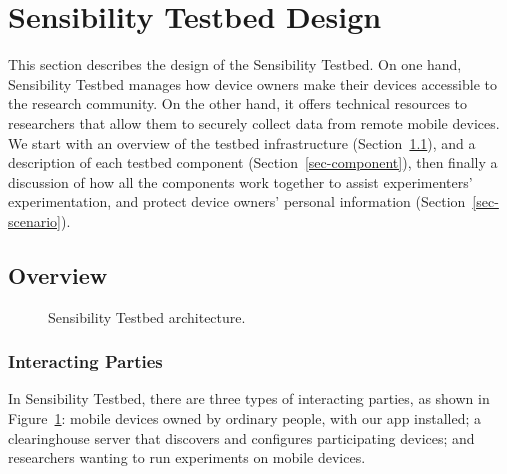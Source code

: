 \section{Sensibility Testbed Design}\label{sec-design}

This section describes the design of the Sensibility Testbed. On one
hand, Sensibility Testbed manages how device owners make their
devices accessible to the research community. On the other hand,
it offers technical resources to researchers that allow them to
securely collect data from remote mobile devices. We start with  
an overview of the testbed infrastructure (Section~\ref{sec-overview}), 
and a description of each testbed component 
(Section~\ref{sec-component}), then finally a discussion of how all the 
components work together to assist experimenters' experimentation,
and protect device owners' personal information 
(Section~\ref{sec-scenario}).

\subsection{Overview}\label{sec-overview}

\begin{figure}
\caption{\small Sensibility Testbed architecture. 
\label{fig-arch}}
\end{figure}

\subsubsection{Interacting Parties}\label{sec-parties}
In Sensibility Testbed, there are three types of interacting
parties, as shown in Figure~\ref{fig-arch}: mobile devices 
owned by ordinary people, with our app installed; a 
clearinghouse server that discovers and configures
participating devices; and researchers wanting to run
experiments on mobile devices. 


